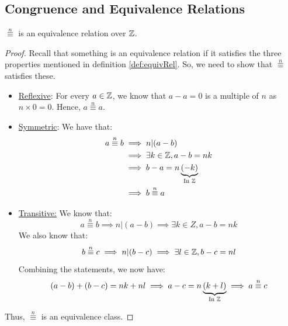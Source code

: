 \documentclass[letterpaper]{article}
\begin{document}
\subsection{Congruence and Equivalence Relations}
\begin{lemma}{}{}
    $\overset{n}{\equiv}$ is an equivalence relation over $\mathbb{Z}$. 
\end{lemma}
\begin{mdframed}
    \begin{proof}
        Recall that something is an equivalence relation if it satisfies the three properties mentioned in definition \ref{def:equivRel}. So, we need to show that $\overset{n}{\equiv}$ satisfies these. 
        \begin{itemize}
            \item \underline{Reflexive}: For every $a \in \mathbb{Z}$, we know that $a - a = 0$ is a multiple of $n$ as $n \times 0 = 0$. Hence, $a \overset{n}{\equiv} a$. 
            \item \underline{Symmetric}: We have that: 
            \begin{equation*}
                \begin{aligned}
                    a \overset{n}{\equiv} b &\implies n | (a - b) \\ 
                        &\implies \exists k \in \mathbb{Z}, a - b = nk \\ 
                        &\implies b - a = n\underbrace{(-k)}_{\text{In } \mathbb{Z}} \\ 
                        &\implies b \overset{n}{\equiv} a
                \end{aligned}
            \end{equation*}
    
            \item \underline{Transitive:} We know that:
            \[a \overset{n}{\equiv} b \implies n | (a - b) \implies \exists k \in Z, a - b = nk\]
            We also know that:
            \[b \overset{n}{\equiv} c \implies n | (b - c) \implies \exists l \in \mathbb{Z}, b - c = nl\]
            Combining the statements, we now have:
            \[(a - b) + (b - c) = nk + nl \implies a - c = n\underbrace{(k + l)}_{\text{In } \mathbb{Z}} \implies a \overset{n}{\equiv} c\]
        \end{itemize}
        Thus, $\overset{n}{\equiv}$ is an equivalence class. 
    \end{proof}
\end{mdframed}
\end{document}
